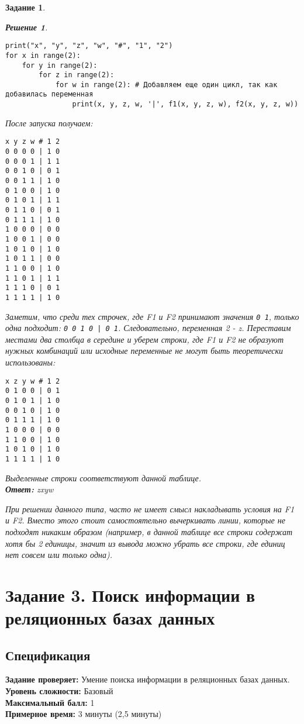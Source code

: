 \documentclass[12pt]{article}
\theoremstyle{problem_style}
\newtheorem{problem}{Задание}[subsection]
\newtheorem{solution}{Решение}[subsection]
\begin{document}
\begin{problem}
\begin{solution}
\begin{verbatim}
print("x", "y", "z", "w", "#", "1", "2")
for x in range(2): 
    for y in range(2):
        for z in range(2): 
            for w in range(2): # Добавляем еще один цикл, так как добавилась переменная
                print(x, y, z, w, '|', f1(x, y, z, w), f2(x, y, z, w))
\end{verbatim}
После запуска получаем:
\begin{verbatim}
x y z w # 1 2
0 0 0 0 | 1 0
0 0 0 1 | 1 1
0 0 1 0 | 0 1
0 0 1 1 | 1 0
0 1 0 0 | 1 0
0 1 0 1 | 1 1
0 1 1 0 | 0 1
0 1 1 1 | 1 0
1 0 0 0 | 0 0
1 0 0 1 | 0 0
1 0 1 0 | 1 0
1 0 1 1 | 0 0
1 1 0 0 | 1 0
1 1 0 1 | 1 1
1 1 1 0 | 0 1
1 1 1 1 | 1 0
\end{verbatim}
Заметим, что среди тех строчек, где F1 и F2 принимают значения \texttt{0 1}, только одна подходит:
\texttt{0 0 1 0 | 0 1}. Следовательно, переменная 2 - z. Переставим местами два столбца в середине и уберем строки, где F1 и F2 не образуют нужных комбинаций или исходные переменные не могут быть теоретически использованы:
\begin{verbatim}
x z y w # 1 2
0 1 0 0 | 0 1
0 1 0 1 | 1 0
0 0 1 0 | 1 0
0 1 1 1 | 1 0
1 0 0 0 | 0 0
1 1 0 0 | 1 0
1 0 1 0 | 1 0
1 1 1 1 | 1 0
\end{verbatim}
Выделенные строки соответствуют данной таблице.\\
\textbf{Ответ:} zxyw
\end{solution}
При решении данного типа, часто не имеет смысл накладывать условия на F1 и F2. Вместо этого стоит самостоятельно вычеркивать линии, которые не подходят никаким образом (например, в данной таблице все строки содержат хотя бы 2 единицы, значит из вывода можно убрать все строки, где единиц нет совсем или только одна).
\end{problem}
\newpage

\section{Задание 3. Поиск информации в реляционных базах данных}
\subsection{Спецификация}
\textbf{Задание проверяет:}
Умение поиска информации в реляционных базах данных.\\
\textbf{Уровень сложности:}
Базовый\\
\textbf{Максимальный балл:}
1\\
\textbf{Примерное время:}
3 минуты (2,5 минуты)
\end{document}
